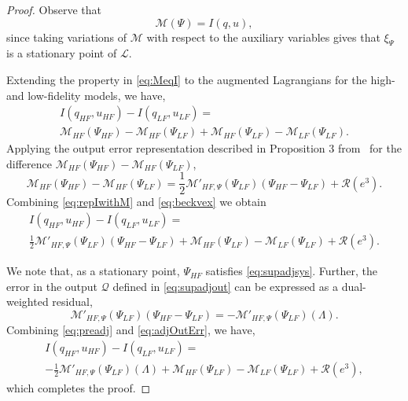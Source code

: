 \begin{proof}
%
Observe that
%
\begin{equation}
\label{eq:MeqI}
\mathcal{M}(\Psi)=I(q,u),
\end{equation}
%
since taking variations of $\mathcal{M}$ with respect to the auxiliary variables gives that $\xi_\Psi$ is a stationary point of $\mathcal{L}$.

Extending the property in \cref{eq:MeqI} to the augmented Lagrangians for the high- and low-fidelity models, we have,
%
\begin{multline}
\label{eq:repIwithM}
I(q_{HF},u_{HF})-I(q_{LF},u_{LF})=\\\mathcal{M}_{HF}(\Psi_{HF})-\mathcal{M}_{HF}(\Psi_{LF})+\mathcal{M}_{HF}(\Psi_{LF})-\mathcal{M}_{LF}(\Psi_{LF})\textrm{.}
\end{multline}
%
Applying the output error representation described in Proposition 3 from~\cite{BecVex05} 
for the difference $\mathcal{M}_{HF}(\Psi_{HF})-\mathcal{M}_{HF}(\Psi_{LF})$,
\begin{equation}
\label{eq:beckvex}
\mathcal{M}_{HF}(\Psi_{HF})-\mathcal{M}_{HF}(\Psi_{LF}) = \frac{1}{2}\mathcal{M}'_{HF,\Psi}(\Psi_{LF})(\Psi_{HF}-\Psi_{LF})+\mathcal{R}(e^3)\textrm{.}
\end{equation}
Combining \cref{eq:repIwithM} and \cref{eq:beckvex} we obtain
\begin{multline}
\label{eq:preadj}
I(q_{HF},u_{HF})-I(q_{LF},u_{LF})=\\\frac{1}{2}\mathcal{M}'_{HF,\Psi}(\Psi_{LF})(\Psi_{HF}-\Psi_{LF})+\mathcal{M}_{HF}(\Psi_{LF})-\mathcal{M}_{LF}(\Psi_{LF})+\mathcal{R}(e^3)\textrm{.}
\end{multline}

We note that, as a stationary point, $\Psi_{HF}$ satisfies \cref{eq:supadjsys}. Further, the error in the output $\mathcal{Q}$ defined in \cref{eq:supadjout} can be expressed as a dual-weighted residual,
\begin{equation}
\label{eq:adjOutErr}
\mathcal M'_{HF,\Psi}(\Psi_{LF})(\Psi_{HF}-\Psi_{LF})=-\mathcal{M}'_{HF,\Psi}(\Psi_{LF})(\Lambda).
\end{equation}
%
Combining \cref{eq:preadj} and \cref{eq:adjOutErr}, we have,
\begin{multline}
I(q_{HF},u_{HF})-I(q_{LF},u_{LF})=\\-\frac{1}{2}\mathcal{M}'_{HF,\Psi}(\Psi_{LF})(\Lambda)+\mathcal M_{HF}(\Psi_{LF})-\mathcal M_{LF}(\Psi_{LF})+\mathcal{R}(e^3), \nonumber
\end{multline}
%
which completes the proof.
\end{proof}
%
